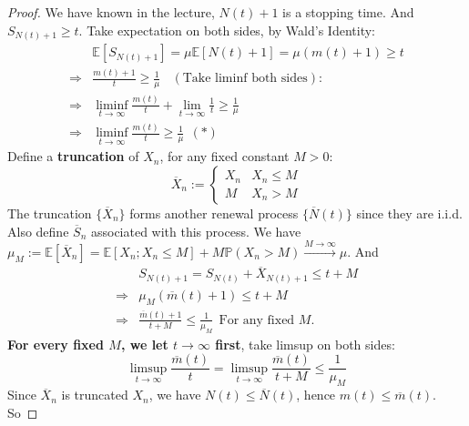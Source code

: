 \documentclass[a4paper, 10pt]{article}
\theoremstyle{definition}
\theoremstyle{hSol}
\begin{document}
\begin{proof} We have known in the lecture, $N(t)+1$ is a stopping time. And $S_{N(t)+1}\geq t$. Take expectation on both sides, by Wald's Identity:
\begin{equation}
  \begin{split}
    & \mathbb{E}\left[S_{N(t)+1}\right] = \mu \mathbb{E}\left[N(t)+1\right] = \mu(m(t)+1)\geq t\\
    \Rightarrow & \frac{m(t)+1}{t} \geq \frac{1}{\mu}~~~~(\text{Take liminf both sides}):\\
    \Rightarrow & \liminf\limits_{t\rightarrow\infty}\frac{m(t)}{t} + \lim\limits_{t\rightarrow\infty}\frac{1}{t} \geq \frac{1}{\mu}\\
    \Rightarrow & \liminf\limits_{t\rightarrow\infty}\frac{m(t)}{t} \geq \frac{1}{\mu}~~(*)
  \end{split}
\end{equation}
Define a \textbf{truncation} of $X_n$, for any fixed constant $M>0$:
\begin{equation}
  \overline{X}_n := 
  \begin{cases} 
    X_n & X_n \leq M \\
    M & X_n > M
  \end{cases}
\end{equation}
The truncation $\{\overline{X}_n\}$ forms another renewal process $\{\overline{N}(t)\}$ since they are i.i.d. Also define $\overline{S}_n$ associated with this process. We have $\mu_M:=\mathbb{E}\left[\overline{X}_n\right]=\mathbb{E}\left[X_n;X_n\leq M\right]+M \mathbb{P}\left(X_n>M\right)\xrightarrow{M\to \infty}\mu$. And
\begin{equation}
  \begin{split}
    & S_{N(t)+1} = S_{N(t)} + \overline{X}_{N(t)+1} \leq t + M \\
    \Rightarrow & \mu_M(\overline{m}(t)+1) \leq t + M \\
    \Rightarrow & \frac{\overline{m}(t)+1}{t+M} \leq \frac{1}{\mu_M}~~\text{For any fixed $M$.}
  \end{split}
\end{equation}
\textbf{For every fixed $M$, we let $t\to \infty$ first}, take limsup on both sides:
\begin{equation}
  \limsup\limits_{t\rightarrow\infty}\frac{\overline{m}(t)}{t}=\limsup\limits_{t\rightarrow\infty}\frac{\overline{m}(t)}{t+M} \leq \frac{1}{\mu_M}
\end{equation}
Since $\overline{X}_n$ is truncated $X_n$, we have $N(t)\leq \overline{N}(t)$, hence $m(t)\leq \overline{m}(t)$. So

\end{proof}
\end{document}
